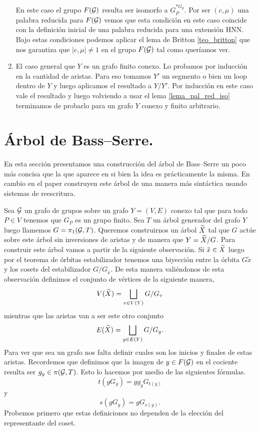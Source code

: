 \documentclass[tesis.tex]{subfiles}
\begin{document}
\begin{enumerate}
		En este caso el grupo $F({\cal G})$ resulta ser isomorfo a $G_P^{\ast G_y}$.
		Por ser $(c, \mu)$ una palabra reducida para $F({\cal G})$ vemos que esta condición en este caso coincide con la definición inicial de una palabra reducida para una extensión HNN.		
		Bajo estas condiciones podemos aplicar el lema de Britton \ref{teo_britton} que nos garantiza que $|c, \mu| \neq 1$ en el grupo $F({\cal G})$ tal como queríamos ver.
		
		\item El caso general que $Y$ es un grafo finito conexo.
		Lo probamos por inducción en la cantidad de aristas. 
		Para eso tomamos $Y'$ un segmento o bien un loop dentro de $Y$ y luego aplicamos el resultado a $Y/Y'$.
		Por inducción en este caso vale el resultado y luego volviendo a usar el lema \ref{lema_pal_red_iso} terminamos de probarlo para un grafo $Y$ conexo y finito arbitrario.
	\end{enumerate}


\section{Árbol de Bass--Serre.}
En esta sección presentamos una construcción del árbol de Bass--Serre un poco más concisa que la que aparece en \cite{serre2002trees} si bien la idea es prácticamente la misma.
En cambio en el paper \cite{diekert2017context} construyen este árbol de una manera más sintáctica usando sistemas de reescritura.

Sea ${\cal G}$ un grafo de grupos sobre un grafo $Y = (V,E)$ conexo tal que para todo $P \in V$ tenemos que $G_{P}$ es un grupo finito. 
Sea $T$ un árbol generador del grafo $Y$ luego llamemos $G = \pi_1({\cal G},T)$.
Queremos construirnos un árbol $\widetilde X$ tal que $G$ actúe sobre este árbol sin inversiones de aristas y de manera que $Y = \widetilde X / G$.
Para construir este árbol vamos a partir de la siguiente observación.
Si $\tilde x \in \widetilde X$ luego por el teorema de órbitas estabilizador tenemos una biyección entre la órbita $G \tilde x $ y los cosets del estabilizador $G / G_{\tilde x}$.
De esta manera valiéndonos de esta observación definimos el conjunto de vértices de la siguiente manera,
\[
V(\widetilde X) = \bigsqcup_{v \in V(Y)} G/G_{v}
\]
mientras que las aristas van a ser este otro conjunto
\[
E(\widetilde X) = \bigsqcup_{y \in E(Y)} G/G_{y}.
\]
Para ver que sea un grafo nos falta definir cuales son los inicios y finales de estas aristas.
Recordemos que definimos que la imagen de $y \in F({\cal G})$ en el cociente resulta ser $g_{y} \in \pi({\cal G},T)$. 
Esto lo hacemos por medio de las siguientes fórmulas.
\[
t(gG_{y}) = gg_{y}G_{t(y)}
\]
y 
\[
s(gG_{y}) = gG_{s(y)}.
\]
Probemos primero que estas definiciones no dependen de la elección del representante del coset.
\end{document}
